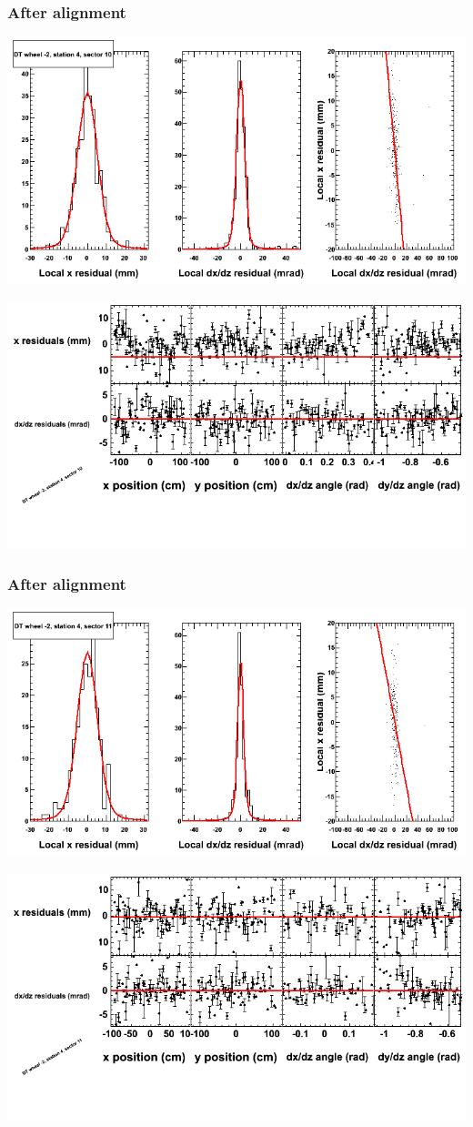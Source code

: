 \documentclass[compress]{beamer}
\begin{document}
\begin{frame}
\frametitle{After alignment}
\includegraphics[width=0.7\linewidth]{NOV4_fitfunctions/MBwhAst4sec10_bellcurves.png}

\includegraphics[width=0.7\linewidth]{NOV4_fitfunctions/MBwhAst4sec10_polynomials.png}
\end{frame}

\begin{frame}
\frametitle{After alignment}
\includegraphics[width=0.7\linewidth]{NOV4_fitfunctions/MBwhAst4sec11_bellcurves.png}

\includegraphics[width=0.7\linewidth]{NOV4_fitfunctions/MBwhAst4sec11_polynomials.png}
\end{frame}
\end{document}
